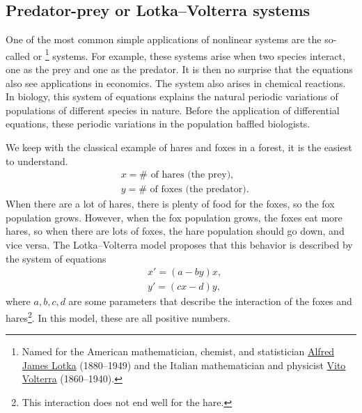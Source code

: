 \subsection{Predator-prey or Lotka--Volterra systems}

One of the most common simple applications of nonlinear systems are the
so-called \emph{} or
\emph{}%
\footnote{Named for the American mathematician, chemist, and statistician
\href{https://en.wikipedia.org/wiki/Alfred_J._Lotka}{Alfred James Lotka}
(1880--1949) and the Italian mathematician and physicist
\href{https://en.wikipedia.org/wiki/Vito_Volterra}{Vito Volterra}
(1860--1940).}
systems.  For example, these systems arise 
when two species interact, one as the prey and one as the predator.  It is
then no surprise that the equations also see applications in economics.
The system also arises in chemical reactions.
In biology, this system of equations explains the natural periodic variations of populations of
different species in nature.  Before the application of differential
equations, these periodic variations in the population baffled biologists.

We keep
with the classical example of hares and foxes in a forest, it is the
easiest to understand.
\begin{equation*}
\begin{aligned}
& x = \# \text{ of hares (the prey),} \\
& y = \# \text{ of foxes (the predator).}
\end{aligned}
\end{equation*}
When there are a lot of hares, there is plenty of food for the foxes, so
the fox population grows.  However, when the fox population grows, the foxes
eat more hares, so when there are lots of foxes, the hare population
should go down, and vice versa.
The Lotka--Volterra model proposes that this 
behavior is described by the system of equations
\begin{equation*}
\begin{aligned}
& x' = (a-by)x, \\
& y' = (cx-d)y,
\end{aligned}
\end{equation*}
where $a,b,c,d$ are some parameters that describe the interaction of the
foxes and hares\footnote{This interaction does not end well for the
hare.}.  In this model, these are all positive numbers.

